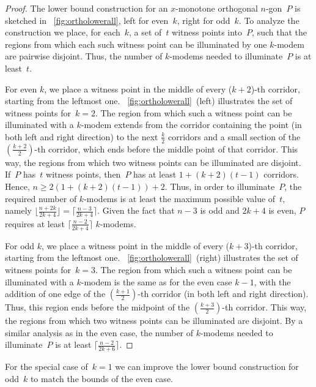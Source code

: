 \documentclass[A4]{article}
\begin{document}
\begin{proof}
  The lower bound construction for an $x$-monotone orthogonal $n$-gon~$P$ is sketched in \figurename~\ref{fig:ortholowerall}, left for even~$k$, right for odd~$k$.
  To analyze the construction we place, for each~$k$, a set of~$t$ witness points into~$P$, such that the regions from which each such witness point can be illuminated by one \mbox{$k$-modem} are pairwise disjoint.
  Thus, the number of \mbox{$k$-modems} needed to illuminate~$P$ is at least~$t$. 

         
  For even $k$, we place a witness point in the middle of every ($k\!+\!2$)-th corridor, starting from the leftmost one.
\figurename~\ref{fig:ortholowerall}~(left) illustrates the set of witness points for~$k=2$.
The region from which such a witness point can be illuminated with a \mbox{$k$-modem} extends from the corridor containing the point (in both left and right direction) to the next $\frac{k}{2}$ corridors and a small section of the $(\frac{k+2}{2})$-th corridor, which ends before the middle point of that corridor. 
This way, the regions from which two witness points can be illuminated are disjoint.
  If~$P$ has~$t$ witness points, then~$P$ has at least $1+(k+2)(t-1)$ corridors.
  Hence, $n \geq 2(1+(k+2)(t-1))+2$.
  Thus, in order to illuminate~$P$, the required number of \mbox{$k$-modems} is at least the maximum possible value of~$t$, namely $\lfloor \frac{n+2k}{2k+4} \rfloor = \lceil \frac{n-3}{2k+4} \rceil$.
  Given the fact that $n-3$ is odd and $2k+4$ is even, $P$ requires at least $\lceil \frac{n-2}{2k+4} \rceil$ \mbox{$k$-modems}. 


  For odd $k$, we place a witness point in the middle of every ($k\!+\!3$)-th corridor, starting from the leftmost one.
\figurename~\ref{fig:ortholowerall}~(right) illustrates the set of witness points for~$k=3$.
The region from which such a witness point can be illuminated with a \mbox{$k$-modem} is the same as for the even case $k-1$, with the addition of one edge of the $(\frac{k+1}{2})$-th corridor (in both left and right direction).
  Thus, this region ends before the midpoint of the $(\frac{k+3}{2})$-th corridor.
  This way, the regions from which two witness points can be illuminated are disjoint.
  By a similar analysis as in the even case, the number of \mbox{$k$-modems} needed to illuminate~$P$ is at least $\lceil \frac{n-2}{2k+6} \rceil$. \end{proof}	 


For the special case of~$k=1$ we can improve the lower bound construction for odd~$k$ to match the bounds of the even case.
\end{document}
